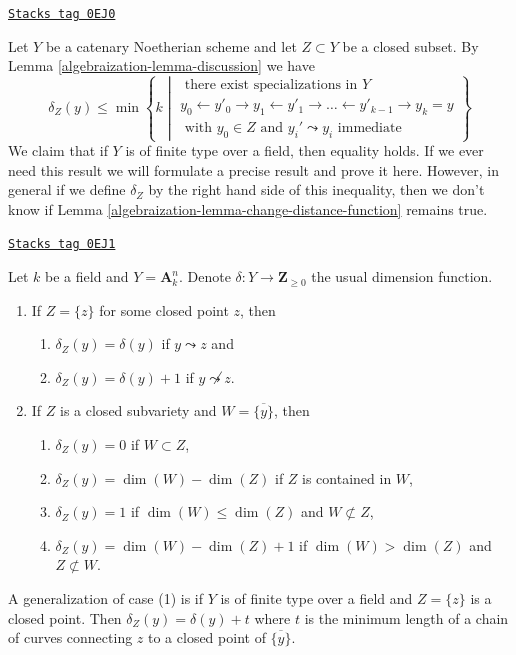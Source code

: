 \begin{remark}[Discussion]
\label{algebraization-remark-discussion}
\href{https://stacks.math.columbia.edu/tag/0EJ0}{\texttt{Stacks tag 0EJ0}}

Let $Y$ be a catenary Noetherian scheme and let $Z \subset Y$
be a closed subset. By Lemma \ref{algebraization-lemma-discussion} we have
$$
\delta_Z(y) \leq \min
\left\{ k \middle|
\begin{matrix}
\text{ there exist specializations in }Y \\
y_0 \leftarrow y'_0 \rightarrow y_1 \leftarrow y'_1 \rightarrow \ldots
\leftarrow y'_{k - 1} \rightarrow y_k = y \\
\text{ with }y_0 \in Z\text{ and }y_i' \leadsto y_i
\text{ immediate}
\end{matrix}
\right\}
$$
We claim that if $Y$ is of finite type over a field,
then equality holds. If we ever need this result we
will formulate a precise result and prove it here.
However, in general if we define $\delta_Z$
by the right hand side of this inequality, then we don't
know if Lemma \ref{algebraization-lemma-change-distance-function} remains true.
\end{remark}

\begin{example}[Distance]
\label{algebraization-example-distance}
\href{https://stacks.math.columbia.edu/tag/0EJ1}{\texttt{Stacks tag 0EJ1}}

Let $k$ be a field and $Y = \mathbf{A}^n_k$. Denote
$\delta : Y \to \mathbf{Z}_{\geq 0}$ the usual dimension function.
\begin{enumerate}
\item If $Z = \{z\}$ for some closed point $z$, then
\begin{enumerate}
\item $\delta_Z(y) = \delta(y)$ if $y \leadsto z$ and
\item $\delta_Z(y) = \delta(y) + 1$ if $y \not \leadsto z$.
\end{enumerate}
\item If $Z$ is a closed subvariety and $W = \overline{\{y\}}$, then
\begin{enumerate}
\item $\delta_Z(y) = 0$ if $W \subset Z$,
\item $\delta_Z(y) = \dim(W) - \dim(Z)$ if $Z$ is contained in $W$,
\item $\delta_Z(y) = 1$ if $\dim(W) \leq \dim(Z)$ and $W \not \subset Z$,
\item $\delta_Z(y) = \dim(W) - \dim(Z) + 1$ if $\dim(W) > \dim(Z)$
and $Z \not \subset W$.
\end{enumerate}
\end{enumerate}
A generalization of case (1) is if $Y$ is of finite type over a field
and $Z = \{z\}$ is a closed point. Then $\delta_Z(y) = \delta(y) + t$
where $t$ is the minimum length of a chain of curves connecting
$z$ to a closed point of $\overline{\{y\}}$.
\end{example}

